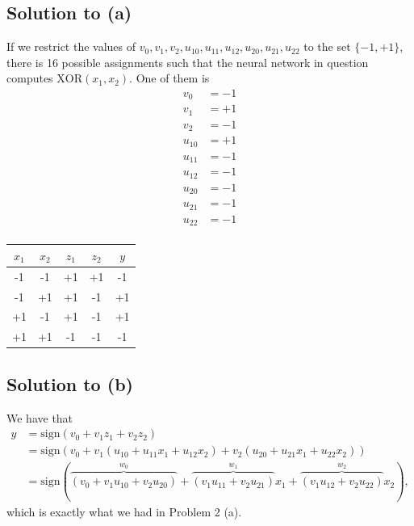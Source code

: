 \documentclass[10pt]{article}
\begin{document}
\subsection*{Solution to (a)}
If we restrict the values of $v_0, v_1, v_2, u_{10}, u_{11}, u_{12}, u_{20}, u_{21}, u_{22}$ to the set $\{ -1, +1 \}$, there is 16 possible assignments such that the neural network in question computes $\text{XOR}(x_1, x_2)$. One of them is
\begin{align*}
v_0 &= -1    \\
v_1 &= +1     \\
v_2 &= -1    \\
u_{10} &= +1  \\
u_{11} &= -1 \\
u_{12} &= -1 \\
u_{20} &= -1 \\
u_{21} &= -1 \\
u_{22} &= -1 \\
\end{align*}

\begin{center}
\begin{tabular}{|c|c|c|c|c|}
\hline
$x_1$ & $x_2$ & $z_1$ & $z_2$ & $y$ \\
\hline
-1 & -1 & +1 & +1 & -1 \\
-1 & +1 & +1 & -1 & +1 \\
+1 & -1 & +1 & -1 & +1 \\
+1 & +1 & -1 & -1 & -1 \\
\hline
\end{tabular}
\end{center}

\subsection*{Solution to (b)}
We have that 
\begin{align*}
y &= \text{sign}(v_0 + v_1 z_1 + v_2 z_2) \\
  &= \text{sign}(v_0 + v_1 (u_{10} + u_{11}x_1 + u_{12}x_2) + v_2 (u_{20} + u_{21}x_1 + u_{22}x_2)) \\
  &= \text{sign}(\overbrace{(v_0 + v_1 u_{10} + v_2 u_{20})}^{w_0} + \overbrace{(v_1 u_{11} + v_2 u_{21})}^{w_1} x_1 + \overbrace{(v_1 u_{12} + v_2 u_{22})}^{w_2} x_2),
\end{align*}
which is exactly what we had in Problem 2 (a).
\end{document}
